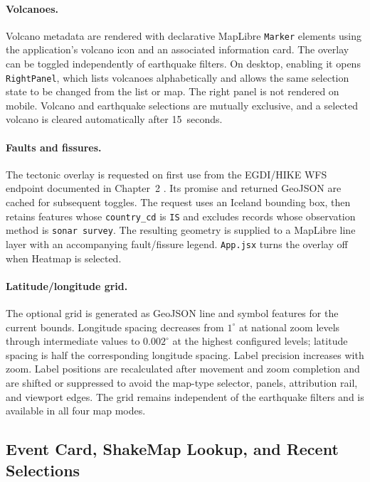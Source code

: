 \documentclass[12pt]{article}
\begin{document}
\paragraph{Volcanoes.} Volcano metadata are rendered with declarative MapLibre \texttt{Marker} elements using the application's volcano icon and an associated information card. The overlay can be toggled independently of earthquake filters. On desktop, enabling it opens \texttt{RightPanel}, which lists volcanoes alphabetically and allows the same selection state to be changed from the list or map. The right panel is not rendered on mobile. Volcano and earthquake selections are mutually exclusive, and a selected volcano is cleared automatically after 15~seconds.

\paragraph{Faults and fissures.} The tectonic overlay is requested on first use from the EGDI/HIKE WFS endpoint documented in Chapter~2 \cite{egdi_hike_iceland_tectonics}. Its promise and returned GeoJSON are cached for subsequent toggles. The request uses an Iceland bounding box, then retains features whose \texttt{country\_cd} is \texttt{IS} and excludes records whose observation method is \texttt{sonar survey}. The resulting geometry is supplied to a MapLibre line layer with an accompanying fault/fissure legend. \texttt{App.jsx} turns the overlay off when Heatmap is selected.

\paragraph{Latitude/longitude grid.} The optional grid is generated as GeoJSON line and symbol features for the current bounds. Longitude spacing decreases from $1^{\circ}$ at national zoom levels through intermediate values to $0.002^{\circ}$ at the highest configured levels; latitude spacing is half the corresponding longitude spacing. Label precision increases with zoom. Label positions are recalculated after movement and zoom completion and are shifted or suppressed to avoid the map-type selector, panels, attribution rail, and viewport edges. The grid remains independent of the earthquake filters and is available in all four map modes.

\subsection{Event Card, ShakeMap Lookup, and Recent Selections}
\label{subsec:frontend_selection}
\end{document}
